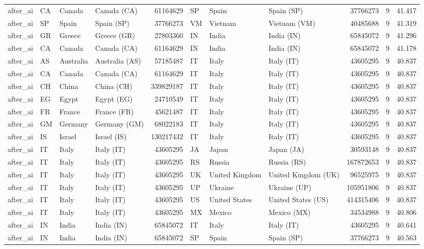 \begin{tabular}{llllrlllrrr}
after\_ai & CA & Canada & Canada (CA) & 61164629 & SP & Spain & Spain (SP) & 37766273 & 9 & 41.417 \\
after\_ai & SP & Spain & Spain (SP) & 37766273 & VM & Vietnam & Vietnam (VM) & 40485688 & 9 & 41.319 \\
after\_ai & GR & Greece & Greece (GR) & 27803360 & IN & India & India (IN) & 65845072 & 9 & 41.296 \\
after\_ai & CA & Canada & Canada (CA) & 61164629 & IN & India & India (IN) & 65845072 & 9 & 41.178 \\
after\_ai & AS & Australia & Australia (AS) & 57185487 & IT & Italy & Italy (IT) & 43605295 & 9 & 40.837 \\
after\_ai & CA & Canada & Canada (CA) & 61164629 & IT & Italy & Italy (IT) & 43605295 & 9 & 40.837 \\
after\_ai & CH & China & China (CH) & 339829187 & IT & Italy & Italy (IT) & 43605295 & 9 & 40.837 \\
after\_ai & EG & Egypt & Egypt (EG) & 24710549 & IT & Italy & Italy (IT) & 43605295 & 9 & 40.837 \\
after\_ai & FR & France & France (FR) & 45621487 & IT & Italy & Italy (IT) & 43605295 & 9 & 40.837 \\
after\_ai & GM & Germany & Germany (GM) & 68022183 & IT & Italy & Italy (IT) & 43605295 & 9 & 40.837 \\
after\_ai & IS & Israel & Israel (IS) & 130217432 & IT & Italy & Italy (IT) & 43605295 & 9 & 40.837 \\
after\_ai & IT & Italy & Italy (IT) & 43605295 & JA & Japan & Japan (JA) & 30593148 & 9 & 40.837 \\
after\_ai & IT & Italy & Italy (IT) & 43605295 & RS & Russia & Russia (RS) & 167872653 & 9 & 40.837 \\
after\_ai & IT & Italy & Italy (IT) & 43605295 & UK & United Kingdom & United Kingdom (UK) & 96525975 & 9 & 40.837 \\
after\_ai & IT & Italy & Italy (IT) & 43605295 & UP & Ukraine & Ukraine (UP) & 105951806 & 9 & 40.837 \\
after\_ai & IT & Italy & Italy (IT) & 43605295 & US & United States & United States (US) & 414315406 & 9 & 40.837 \\
after\_ai & IT & Italy & Italy (IT) & 43605295 & MX & Mexico & Mexico (MX) & 34534988 & 9 & 40.806 \\
after\_ai & IN & India & India (IN) & 65845072 & IT & Italy & Italy (IT) & 43605295 & 9 & 40.641 \\
after\_ai & IN & India & India (IN) & 65845072 & SP & Spain & Spain (SP) & 37766273 & 9 & 40.563 \\

\end{tabular}
